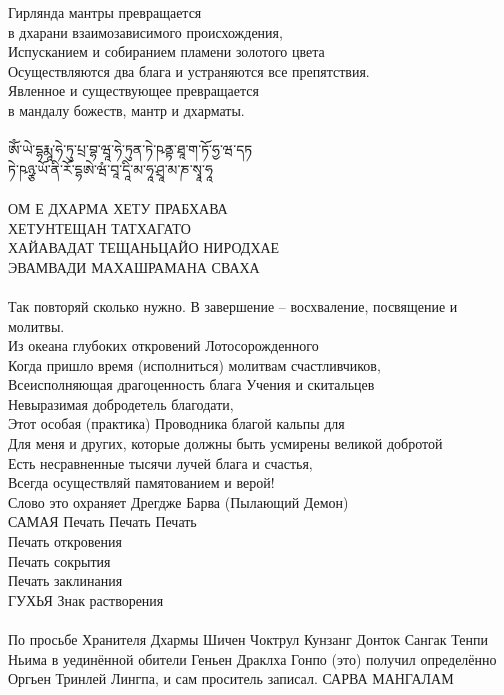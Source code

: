 \newpage
Гирлянда мантры превращается \\ \indent в дхарани взаимозависимого происхождения,\\
Испусканием и собиранием пламени золотого цвета\\
Осуществляются два блага и устраняются все препятствия.\\
Явленное и существующее превращается \\ \indent в мандалу божеств, мантр и дхарматы.\\
\\
\ti
ཨོཾ་ཡེ་དྷརྨཱ་ཧེ་ཏུ་པྲ་བྷ་ཝཱ་ཧེ་ཏུན་ཏེ་ཥནྟ་ཐཱ་ག་ཏོ་ཧྱ་ཝ་དཏ\\
ཏེ་ཥཉྩ་ཡོ་ནི་རོ་དྷཨེ་ཝཾ་བཱ་དཱི་མ་ཧཱ་ཤྲཱ་མ་ཎ་སྭཱ་ཧཱ  \\
\\
\ru ОМ Е ДХАРМА ХЕТУ ПРАБХАВА \\
ХЕТУНТЕЩАН ТАТХАГАТО \\
ХАЙАВАДАТ ТЕЩАНЬЦАЙО НИРОДХАЕ\\
ЭВАМВАДИ МАХАШРАМАНА СВАХА\\
\\
\scriptsize
Так повторяй сколько нужно. В завершение – восхваление, посвящение и молитвы.\\
Из океана глубоких откровений Лотосорожденного\\
Когда пришло время (исполниться) молитвам счастливчиков,\\
Всеисполняющая драгоценность блага Учения и скитальцев\\
Невыразимая добродетель благодати,\\
Этот особая (практика) Проводника благой кальпы для\\
Для меня и других, которые должны быть усмирены великой добротой\\
Есть несравненные тысячи лучей блага и счастья,\\
Всегда осуществляй памятованием и верой!\\
Слово это охраняет Дрегдже Барва (Пылающий Демон)\\
САМАЯ Печать Печать Печать \\
Печать откровения \\
Печать сокрытия \\
Печать заклинания \\
ГУХЬЯ Знак растворения\\
\\
По просьбе Хранителя Дхармы Шичен Чоктрул Кунзанг Донток Сангак Тенпи Ньима 
в уединённой обители Геньен Драклха Гонпо (это) получил определённо 
Оргьен Тринлей Лингпа, и сам проситель записал. САРВА МАНГАЛАМ\\
\normalsize
\newpage
